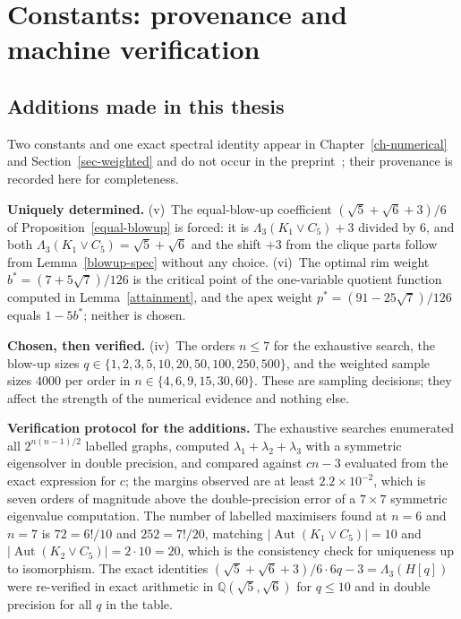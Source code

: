 \chapter{Constants: provenance and machine verification}\label{sec-appendix}


\section*{Additions made in this thesis}
Two constants and one exact spectral identity appear in
Chapter~\ref{ch-numerical} and Section~\ref{sec-weighted} and do not occur in
the preprint~\cite{Ji}; their provenance is recorded here for completeness.

\textbf{Uniquely determined.}
(v)~The equal-blow-up coefficient $(\sqrt5+\sqrt6+3)/6$ of
Proposition~\ref{equal-blowup} is forced: it is $\Lambda_3(K_1\vee C_5)+3$
divided by $6$, and both $\Lambda_3(K_1\vee C_5)=\sqrt5+\sqrt6$ and the shift
$+3$ from the clique parts follow from Lemma~\ref{blowup-spec} without any
choice.
(vi)~The optimal rim weight $b^*=(7+5\sqrt7)/126$ is the critical point of
the one-variable quotient function computed in Lemma~\ref{attainment}, and the
apex weight $p^*=(91-25\sqrt7)/126$ equals $1-5b^*$; neither is chosen.

\textbf{Chosen, then verified.}
(iv)~The orders $n\le7$ for the exhaustive search, the blow-up sizes
$q\in\{1,2,3,5,10,20,50,100,250,500\}$, and the weighted sample sizes
$4000$ per order in $n\in\{4,6,9,15,30,60\}$. These are sampling decisions;
they affect the strength of the numerical evidence and nothing else.

\textbf{Verification protocol for the additions.} The exhaustive searches
enumerated all $2^{n(n-1)/2}$ labelled graphs, computed
$\lambda_1+\lambda_2+\lambda_3$ with a symmetric eigensolver in double
precision, and compared against $cn-3$ evaluated from the exact expression
for $c$; the margins observed are at least $2.2\times10^{-2}$, which is seven
orders of magnitude above the double-precision error of a $7\times7$ symmetric
eigenvalue computation. The number of labelled maximisers found at $n=6$ and
$n=7$ is $72=6!/10$ and $252=7!/20$, matching
$|\operatorname{Aut}(K_1\vee C_5)|=10$ and
$|\operatorname{Aut}(K_2\vee C_5)|=2\cdot10=20$, which is the consistency
check for uniqueness up to isomorphism. The exact identities
$(\sqrt5+\sqrt6+3)/6\cdot6q-3=\Lambda_3(H[q])$ were re-verified in exact
arithmetic in $\mathbb Q(\sqrt5,\sqrt6)$ for $q\le10$ and in double precision
for all $q$ in the table.
